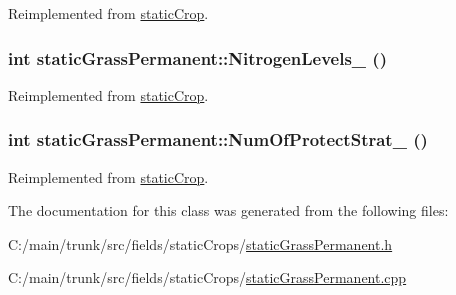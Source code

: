 Reimplemented from \hyperlink{classstatic_crop_a9b67ef1ae531a3afb32b63a4aeb5916b}{staticCrop}.\hypertarget{classstatic_grass_permanent_a4e133fb5bd5133df57babfd2852fb466}{
\subsubsection[{NitrogenLevels\_\-}]{\setlength{\rightskip}{0pt plus 5cm}int staticGrassPermanent::NitrogenLevels\_\- ()}}
\label{classstatic_grass_permanent_a4e133fb5bd5133df57babfd2852fb466}


Reimplemented from \hyperlink{classstatic_crop_a32b69ed138beaed150efa74d18e82d8e}{staticCrop}.\hypertarget{classstatic_grass_permanent_a5af2b1a01c23e599e7391e972c15cbba}{
\subsubsection[{NumOfProtectStrat\_\-}]{\setlength{\rightskip}{0pt plus 5cm}int staticGrassPermanent::NumOfProtectStrat\_\- ()}}
\label{classstatic_grass_permanent_a5af2b1a01c23e599e7391e972c15cbba}


Reimplemented from \hyperlink{classstatic_crop_a4d3d767f569f48eb68ffa76822302467}{staticCrop}.

The documentation for this class was generated from the following files:\begin{DoxyCompactItemize}
\item 
C:/main/trunk/src/fields/staticCrops/\hyperlink{static_grass_permanent_8h}{staticGrassPermanent.h}\item 
C:/main/trunk/src/fields/staticCrops/\hyperlink{static_grass_permanent_8cpp}{staticGrassPermanent.cpp}\end{DoxyCompactItemize}
